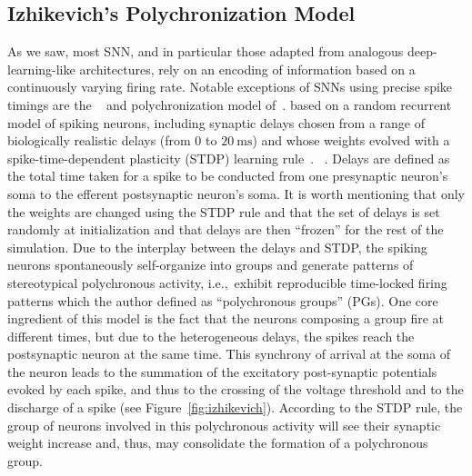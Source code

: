 \documentclass[brainsci, %
               review,accept,pdftex,moreauthors
               ]{Definitions/mdpi}
\newcommand{\ms}{\si{\milli\second}}%
\begin{document}
\subsection{Izhikevich's Polychronization Model}
As we saw, most SNN, and in particular those adapted from analogous deep-learning-like architectures, rely on an encoding of information based on a continuously varying firing rate. Notable exceptions of SNNs using precise spike timings are the ~\citet{lazar_time_2004} and polychronization model of~\citet{izhikevich_polychronization_2006}.  based on a random recurrent model of spiking neurons, including synaptic delays chosen from a range of biologically realistic delays (from $0$ to $20~\ms$) and whose weights evolved with a spike-time-dependent plasticity (STDP) learning rule~\citep{markram_regulation_1997}. ~\citep{caporale_spike_2008}. Delays are defined as the total time taken for a spike to be conducted from one presynaptic neuron's soma to the efferent postsynaptic neuron's soma. It is worth mentioning that only the weights are changed using the STDP rule and that the set of delays is set randomly at initialization and that delays are then ``frozen'' for the rest of the simulation. Due to the interplay between the delays and STDP, the spiking neurons spontaneously self-organize into groups and generate patterns of stereotypical polychronous activity, i.e.,~exhibit reproducible time-locked firing patterns which  the author defined as ``polychronous groups'' (PGs). One core ingredient of this model is the fact that the neurons composing a group fire at different times, but due to the heterogeneous delays, the spikes reach the postsynaptic neuron at the same time. This synchrony of arrival at the soma of the neuron leads to the summation of the excitatory post-synaptic potentials evoked by each spike, and thus to the crossing of the voltage threshold and to the discharge of a spike (see Figure~\ref{fig:izhikevich}). According to the STDP rule, the group of neurons involved in this polychronous activity will see their synaptic weight increase and, thus, may consolidate the formation of a polychronous group. 
%
\end{document}
